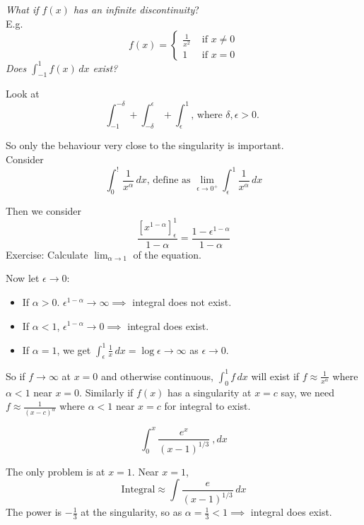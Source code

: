 \documentclass[twoside]{scrartcl}
\begin{document}
\emph{What if $f(x)$ has an infinite discontinuity}?\\

E.g. \[f(x) = \begin{cases}
 \frac{1}{x^2} & \mbox{ if $x \neq 0$}\\
 1 & \mbox{ if $x = 0$}	
 \end{cases}
\]	
\emph{Does $\displaystyle{\int_{-1}^1 f(x)\,dx}$ exist?}

Look at 
\[\int_{-1}^{-\delta} + \int_{-\delta}^{\epsilon} + \int_{\epsilon}^1 \mbox{, where $\delta, \epsilon >0$. 
}\]

So only the behaviour very close to the singularity is important.\\

Consider 
\[\int_0^! \frac{1}{x^{\alpha}}\,dx \text{, define as }\lim_{\epsilon \to 0^+}\int_{\epsilon}^1 \frac{1}{x^{\alpha}}\,dx\]

Then we consider
\[\frac{[x^{1-\alpha}]_{\epsilon}^1}{1-\alpha} = \frac{1-\epsilon^{1-\alpha}}{1-\alpha}\]
Exercise: Calculate $\lim_{\alpha \to 1}$ of the equation. 

Now let $\epsilon \to 0$:
\begin{itemize}
  \item If $\alpha > 0$. $\epsilon^{1-\alpha} \to \infty \implies$ integral does not exist. 
  \item If $\alpha < 1$, $\epsilon^{1-\alpha} \to 0\implies$ integral does exist. 
  \item If $\alpha = 1$, we get $\int_{\epsilon}^1 \frac{1}{x}\,dx = \log \epsilon \to \infty$ as $\epsilon \to 0$. 
\end{itemize}\vspace*{5pt}

So if $f \to \infty$ at $x = 0$ and otherwise continuous, $\int_0^1 f\,dx$ will exist if $f \approx \frac{1}{x^\alpha}$ where $\alpha < 1$ near $x = 0$. Similarly if $f(x)$ has a singularity at $x =c$ say, we need $f \approx \frac{1}{(x-c)^{\alpha}}$ where $\alpha < 1$ near $x=c$ for integral to exist.\\

\begin{example}
\[\int_0^x \frac{e^x}{(x-1)^{1/3}}\
,dx\]	

The only problem is at $x=1$. Near $x=1$, 
\[\text{Integral} \approx \int\frac{e}{(x-1)^{1/3}}\,dx\]
The power is $-\frac{1}{3}$ at the singularity, so as $\alpha = \frac{1}{3} < 1 \implies$ integral does exist.
\end{example}
\end{document}
